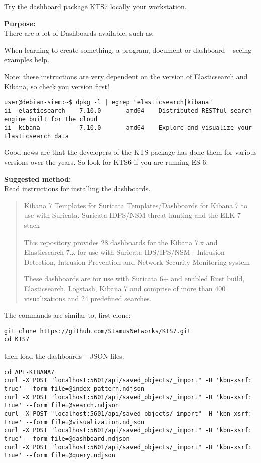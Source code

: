 \documentclass[a4paper,11pt,notitlepage]{report}
\begin{document}
Try the dashboard package KTS7 locally your workstation.


{\bf Purpose:}\\
There are a lot of Dashboards available, such as:\\

When learning to create something, a program, document or dashboard -- seeing examples help.

Note: these instructions are very dependent on the version of Elasticsearch and Kibana, so check you version first!
\begin{verbatim}
user@debian-siem:~$ dpkg -l | egrep "elasticsearch|kibana"
ii  elasticsearch    7.10.0       amd64    Distributed RESTful search engine built for the cloud
ii  kibana           7.10.0       amd64    Explore and visualize your Elasticsearch data
\end{verbatim}

Good news are that the developers of the KTS package has done them for various versions over the years. So look for KTS6 if you are running ES 6.

{\bf Suggested method:}\\
Read instructions for installing the dashboards.


\begin{quote}
Kibana 7 Templates for Suricata
Templates/Dashboards for Kibana 7 to use with Suricata. Suricata IDPS/NSM threat hunting and the ELK 7 stack

This repository provides 28 dashboards for the Kibana 7.x and Elasticsearch 7.x for use with Suricata IDS/IPS/NSM - Intrusion Detection, Intrusion Prevention and Network Security Monitoring system

These dashboards are for use with Suricata 6+ and enabled Rust build, Elasticsearch, Logstash, Kibana 7 and comprise of more than 400 visualizations and 24 predefined searches.
\end{quote}

The commands are similar to, first clone:
\begin{verbatim}
git clone https://github.com/StamusNetworks/KTS7.git
cd KTS7
\end{verbatim}

\eject
then load the dashboards -- JSON files:
\begin{verbatim}
cd API-KIBANA7
curl -X POST "localhost:5601/api/saved_objects/_import" -H 'kbn-xsrf: true' --form file=@index-pattern.ndjson
curl -X POST "localhost:5601/api/saved_objects/_import" -H 'kbn-xsrf: true' --form file=@search.ndjson
curl -X POST "localhost:5601/api/saved_objects/_import" -H 'kbn-xsrf: true' --form file=@visualization.ndjson
curl -X POST "localhost:5601/api/saved_objects/_import" -H 'kbn-xsrf: true' --form file=@dashboard.ndjson
curl -X POST "localhost:5601/api/saved_objects/_import" -H 'kbn-xsrf: true' --form file=@query.ndjson
\end{verbatim}
\end{document}
